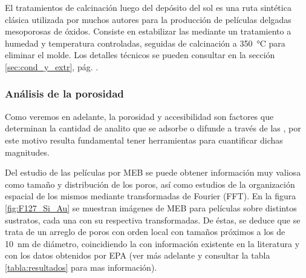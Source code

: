 	 		El tratamientos de calcinación luego del depósito del sol es una ruta sintética clásica utilizada por muchos autores para la producción de películas delgadas mesoporosas de óxidos\cite{Soler-Illia2002a,Brinker1999,Soler-Illia2006,Grosso2004,Innocenzi2013,angelome2011}. Consiste en estabilizar las \pdm\space mediante un tratamiento a humedad y temperatura controladas, seguidas de calcinación a \SI{350}{\celsius} para eliminar el molde. Los detalles técnicos se pueden consultar en la sección \ref{sec:cond_y_extr}, pág. \pageref{sec:cond_y_extr}.

	 	  \subsubsection{Análisis de la porosidad}

		 Como veremos en adelante, la porosidad y accesibilidad son factores que determinan la cantidad de analito que se adsorbe o difunde a través de las \pdm, por este motivo resulta fundamental tener herramientas para cuantificar dichas magnitudes. 

		 Del estudio de las películas por MEB se puede obtener información muy valiosa como tamaño y distribución de los poros, así como estudios de la organización espacial de los mismos mediante transformadas de Fourier (FFT). En la figura \ref{fig:F127_Si_Au} se muestran imágenes de MEB para películas \pdmF sobre distintos sustratos, cada una con su respectiva transformadas. De éstas, se deduce que se trata de un arreglo de poros con orden local con tamaños próximos a los de \SI{10}{\nm} de diámetro, coincidiendo la con información existente en la literatura\cite{urade2005,angelome2011,lee2006} y con los datos obtenidos por EPA (ver más adelante y consultar la tabla \ref{tabla:resultados} para mas información).  

